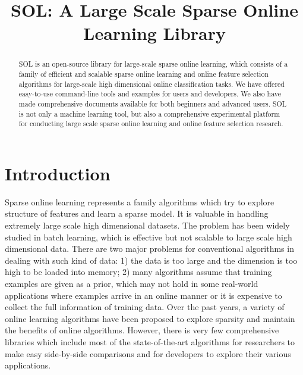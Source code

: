 \documentclass[11pt,a4paper]{article}
\newcommand{\subtitle}[1]{%
  \posttitle{%
    \par\end{center}
    \begin{center}\large#1\end{center}
    \vskip0.5em}%
}
\begin{document}
\title{\LARGE\textsf{SOL}: A Large Scale Sparse Online Learning Library}

\subtitle{Version 0.2.0}

\author{}

\maketitle

\begin{abstract}%
    \textsf{SOL} is an open-source library for large-scale sparse online learning,
    which consists of a family of efficient and scalable sparse online learning
    and online feature selection algorithms for large-scale high dimensional
    online  classification tasks. We have offered easy-to-use command-line
    tools and examples for users and developers. We also have made
    comprehensive documents available for both beginners and advanced users.
    SOL is not only a machine learning tool, but also a comprehensive
    experimental platform for conducting large scale sparse online learning and
    online feature selection research.
\end{abstract}

\newpage
\tableofcontents

\newpage

\section{Introduction}

Sparse online learning represents a family algorithms which try to explore
structure of features and learn a sparse model. It is valuable in handling
extremely large scale high dimensional datasets. The problem has been widely
studied in batch learning, which is effective but not scalable to large scale
high dimensional data. There are two major problems for conventional algorithms
in dealing with such kind of data: 1) the data is too large and the dimension
is too high to be loaded into memory; 2) many algorithms assume that training
examples are given as a prior, which may not hold in some real-world
applications where examples arrive in an online manner or it is expensive to
collect the full information of training data. Over the past years, a variety
of online learning algorithms have been proposed to explore sparsity and
maintain the benefits of online algorithms. However, there is very few
comprehensive libraries which include most of the state-of-the-art algorithms
for researchers to make easy side-by-side comparisons and for developers to
explore their various applications.
\end{document}
